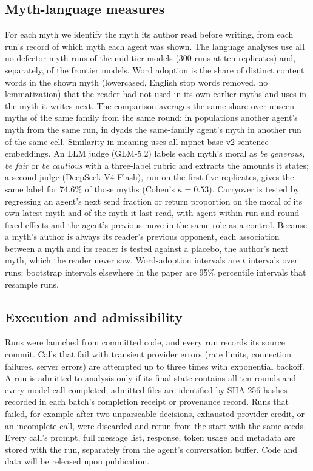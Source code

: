 \subsection{Myth-language measures}
\label{sec:protocol-language}

For each myth we identify the myth its author read before writing, from each run's record of which myth each agent was shown. The language analyses use all no-defector myth runs of the mid-tier models (300 runs at ten replicates) and, separately, of the frontier models. Word adoption is the share of distinct content words in the shown myth (lowercased, English stop words removed, no lemmatization) that the reader had not used in its own earlier myths and uses in the myth it writes next. The comparison averages the same share over unseen myths of the same family from the same round: in populations another agent's myth from the same run, in dyads the same-family agent's myth in another run of the same cell. Similarity in meaning uses all-mpnet-base-v2 sentence embeddings. An LLM judge (GLM-5.2) labels each myth's moral as \emph{be generous}, \emph{be fair} or \emph{be cautious} with a three-label rubric and extracts the amounts it states; a second judge (DeepSeek V4 Flash), run on the first five replicates, gives the same label for 74.6\% of those myths (Cohen's $\kappa=0.53$). Carryover is tested by regressing an agent's next send fraction or return proportion on the moral of its own latest myth and of the myth it last read, with agent-within-run and round fixed effects and the agent's previous move in the same role as a control. Because a myth's author is always its reader's previous opponent, each association between a myth and its reader is tested against a placebo, the author's next myth, which the reader never saw. Word-adoption intervals are $t$ intervals over runs; bootstrap intervals elsewhere in the paper are 95\% percentile intervals that resample runs.

\subsection{Execution and admissibility}
\label{sec:protocol-execution}

Runs were launched from committed code, and every run records its source commit. Calls that fail with transient provider errors (rate limits, connection failures, server errors) are attempted up to three times with exponential backoff. A run is admitted to analysis only if its final state contains all ten rounds and every model call completed; admitted files are identified by SHA-256 hashes recorded in each batch's completion receipt or provenance record. Runs that failed, for example after two unparseable decisions, exhausted provider credit, or an incomplete call, were discarded and rerun from the start with the same seeds. Every call's prompt, full message list, response, token usage and metadata are stored with the run, separately from the agent's conversation buffer. Code and data will be released upon publication.
